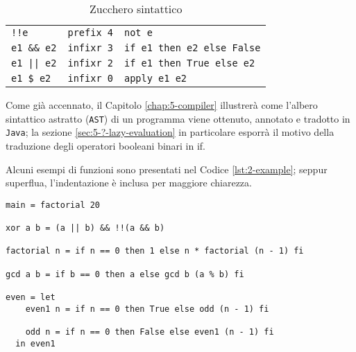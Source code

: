 \begin{table}[H]
\begin{center}
\begin{tabularx}{\textwidth}{|p{8em}@{\quad}p{7em}|X|}
            \texttt{!!e}                 & \texttt{prefix 4} & \texttt{not e}                    \\
            \texttt{e1 \&\& e2}          & \texttt{infixr 3} & \texttt{if e1 then e2 else False} \\
            \texttt{e1 || e2}            & \texttt{infixr 2} & \texttt{if e1 then True else e2}  \\
            \texttt{e1 \$ e2}            & \texttt{infixr 0} & \texttt{apply e1 e2}              \\
            \hline
        \end{tabularx}
    \end{center}
    \caption{Zucchero sintattico}
    \label{tab:2-sugar}
\end{table}

\newpage

\noindent Come già accennato, il Capitolo \ref{chap:5-compiler} illustrerà come l'albero sintattico astratto (\texttt{AST})
di un programma viene ottenuto, annotato e tradotto in \texttt{Java}; la sezione \ref{sec:5-?-lazy-evaluation}
in particolare esporrà il motivo della traduzione degli operatori booleani binari in if.

\noindent Alcuni esempi di funzioni sono presentati nel Codice \ref{lst:2-example};
seppur superflua, l'indentazione è inclusa per maggiore chiarezza.

\vspace{4mm}
\begin{lstlisting}[caption={Esempio di programma}, style=funxCode, label={lst:2-example}]
main = factorial 20

xor a b = (a || b) && !!(a && b)

factorial n = if n == 0 then 1 else n * factorial (n - 1) fi

gcd a b = if b == 0 then a else gcd b (a % b) fi

even = let
    even1 n = if n == 0 then True else odd (n - 1) fi

    odd n = if n == 0 then False else even1 (n - 1) fi
  in even1
\end{lstlisting}